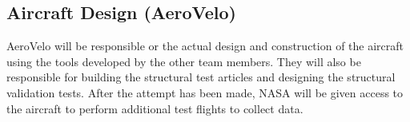 \documentclass[]{aiaa-tc}
\begin{document}


    \subsection{Aircraft Design (AeroVelo)}

    AeroVelo will be responsible or the actual design and construction of the aircraft using the tools developed 
    by the other team members. They will also be responsible for building the structural test articles and designing 
    the structural validation tests. After the attempt has been made, NASA will be given access to 
    the aircraft to perform additional test flights to collect data. 

\end{document}
